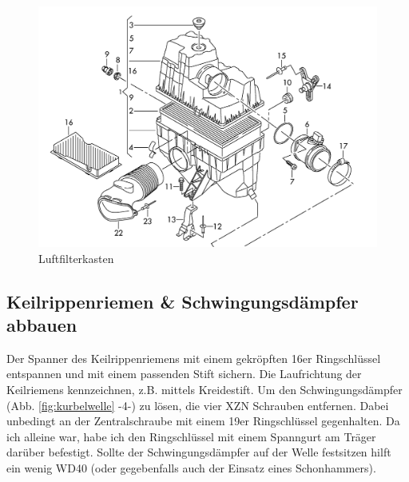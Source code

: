 \documentclass[twoside,a4paper]{refart}
\begin{document}
\begin{figure}[htb]
	\begin{center}
		\includegraphics[width=\textwidth]{Luftfilterkasten}
		\caption{Luftfilterkasten}
		\label{fig:luftfilerkasten}
	\end{center}
\end{figure}

\newpage
\subsection{Keilrippenriemen \& Schwingungsdämpfer abbauen}
Der Spanner des Keilrippenriemens mit einem gekröpften 16er Ringschlüssel entspannen und mit einem passenden Stift sichern. Die Laufrichtung der Keilriemens kennzeichnen, z.B. mittels Kreidestift.
Um den Schwingungsdämpfer (Abb. \ref{fig:kurbelwelle} -4-) zu lösen, die vier XZN Schrauben entfernen. Dabei unbedingt an der Zentralschraube mit einem 19er Ringschlüssel gegenhalten. Da ich alleine war, habe ich den Ringschlüssel mit einem Spanngurt am Träger darüber befestigt. Sollte der Schwingungsdämpfer auf der Welle festsitzen hilft ein wenig WD40 (oder gegebenfalls auch der Einsatz eines Schonhammers).
\end{document}
